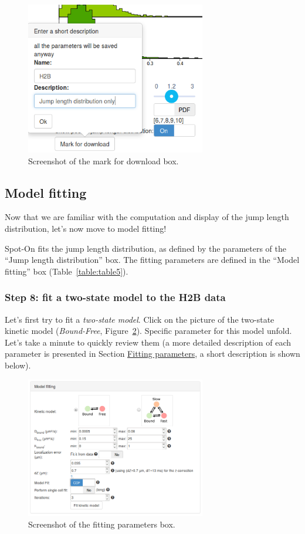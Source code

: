 \begin{figure}[H]
\centering
\includegraphics[width=0.7\textwidth]{../SPTGUI/static/SPTGUI/img/tutorial/0.7/tuto9.png}
\caption{\label{fig:tuto9}Screenshot of the mark for download box.}
\end{figure}

\subsection{Model fitting}
Now that we are familiar with the computation and display of the jump length distribution, let's now move to model fitting!

Spot-On fits the jump length distribution, as defined by the parameters of the ``Jump length distribution'' box. The fitting parameters are defined in the ``Model fitting'' box (Table~\ref{table:table5}).

\subsubsection{Step 8: fit a two-state model to the H2B data}
Let's first try to fit a \textit{two-state model}. Click on the picture of the two-state kinetic model (\textit{Bound-Free}, Figure~\ref{fig:tuto10}). Specific parameter for this model unfold. Let's take a minute to quickly review them (a more detailed description of each parameter is presented in Section \href{https://spoton.berkeley.edu/SPTGUI/docs/latest#fit-parameters}{Fitting parameters}, a short description is shown below).

\begin{figure}[H]
\centering
\includegraphics[width=0.7\textwidth]{../SPTGUI/static/SPTGUI/img/tutorial/0.7/tuto10.png}
\caption{\label{fig:tuto10}Screenshot of the fitting parameters box.}
\end{figure}

